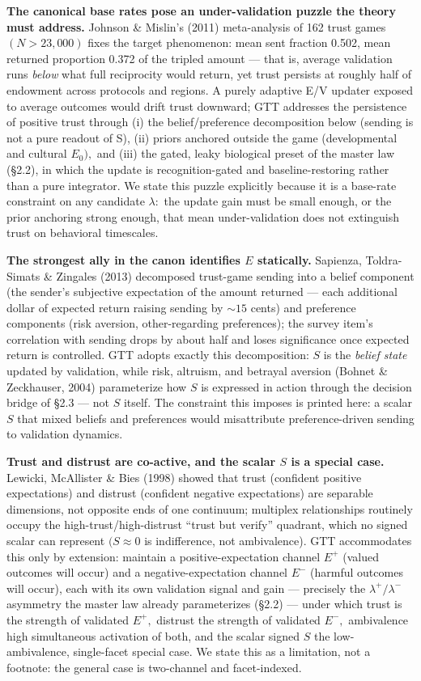 \documentclass[11pt,twocolumn]{article}
\theoremstyle{gttdef}
\theoremstyle{gttplain}
\begin{document}
\textbf{The canonical base rates pose an under-validation puzzle the theory must address.} Johnson \& Mislin's (2011) meta-analysis of 162 trust games $(N > 23,000)$ fixes the target phenomenon: mean sent fraction 0.502, mean returned proportion 0.372 of the tripled amount --- that is, average validation runs \emph{below} what full reciprocity would return, yet trust persists at roughly half of endowment across protocols and regions. A purely adaptive E/V updater exposed to average outcomes would drift trust downward; GTT addresses the persistence of positive trust through (i) the belief/preference decomposition below (sending is not a pure readout of S), (ii) priors anchored outside the game (developmental and cultural $E_{0}),$ and (iii) the gated, leaky biological preset of the master law (\S{}2.2), in which the update is recognition-gated and baseline-restoring rather than a pure integrator. We state this puzzle explicitly because it is a base-rate constraint on any candidate $\lambda:$ the update gain must be small enough, or the prior anchoring strong enough, that mean under-validation does not extinguish trust on behavioral timescales.

\textbf{The strongest ally in the canon identifies $E$ statically.} Sapienza, Toldra-Simats \& Zingales (2013) decomposed trust-game sending into a belief component (the sender's subjective expectation of the amount returned --- each additional dollar of expected return raising sending by $\sim15$ cents) and preference components (risk aversion, other-regarding preferences); the survey item's correlation with sending drops by about half and loses significance once expected return is controlled. GTT adopts exactly this decomposition: $S$ is the \emph{belief state} updated by validation, while risk, altruism, and betrayal aversion (Bohnet \& Zeckhauser, 2004) parameterize how $S$ is expressed in action through the decision bridge of \S{}2.3 --- not $S$ itself. The constraint this imposes is printed here: a scalar $S$ that mixed beliefs and preferences would misattribute preference-driven sending to validation dynamics.

\textbf{Trust and distrust are co-active, and the scalar $S$ is a special case.} Lewicki, McAllister \& Bies (1998) showed that trust (confident positive expectations) and distrust (confident negative expectations) are separable dimensions, not opposite ends of one continuum; multiplex relationships routinely occupy the high-trust/high-distrust ``trust but verify'' quadrant, which no signed scalar can represent $(S \approx 0$ is indifference, not ambivalence). GTT accommodates this only by extension: maintain a positive-expectation channel $E^{+}$ (valued outcomes will occur) and a negative-expectation channel $E^{-}$ (harmful outcomes will occur), each with its own validation signal and gain --- precisely the $\lambda^{+}/\lambda^{-}$ asymmetry the master law already parameterizes (\S{}2.2) --- under which trust is the strength of validated $E^{+},$ distrust the strength of validated $E^{-},$ ambivalence high simultaneous activation of both, and the scalar signed $S$ the low-ambivalence, single-facet special case. We state this as a limitation, not a footnote: the general case is two-channel and facet-indexed.
\end{document}
